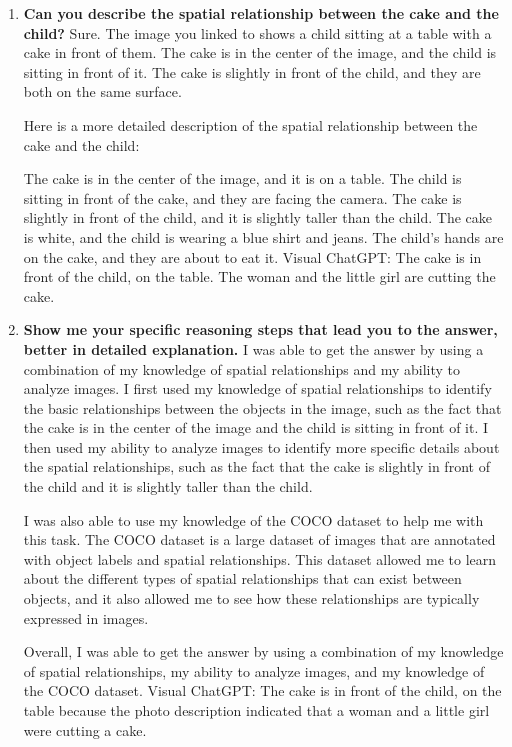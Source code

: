     \begin{enumerate}
        \item \textbf{Can you describe the spatial relationship between the cake and the child?}
        \subitem 
        Sure. The image you linked to shows a child sitting at a table with a cake in front of them. The cake is in the center of the image, and the child is sitting in front of it. The cake is slightly in front of the child, and they are both on the same surface.
        
        Here is a more detailed description of the spatial relationship between the cake and the child:
        
        The cake is in the center of the image, and it is on a table.
        The child is sitting in front of the cake, and they are facing the camera.
        The cake is slightly in front of the child, and it is slightly taller than the child.
        The cake is white, and the child is wearing a blue shirt and jeans.
        The child's hands are on the cake, and they are about to eat it.
        \subitem Visual ChatGPT: The cake is in front of the child, on the table. The woman and the little girl are cutting the cake.
        \item \textbf{Show me your specific reasoning steps that lead you to the answer, better in detailed explanation.}
        \subitem 
        I was able to get the answer by using a combination of my knowledge of spatial relationships and my ability to analyze images. I first used my knowledge of spatial relationships to identify the basic relationships between the objects in the image, such as the fact that the cake is in the center of the image and the child is sitting in front of it. I then used my ability to analyze images to identify more specific details about the spatial relationships, such as the fact that the cake is slightly in front of the child and it is slightly taller than the child.
        
        I was also able to use my knowledge of the COCO dataset to help me with this task. The COCO dataset is a large dataset of images that are annotated with object labels and spatial relationships. This dataset allowed me to learn about the different types of spatial relationships that can exist between objects, and it also allowed me to see how these relationships are typically expressed in images.
        
        Overall, I was able to get the answer by using a combination of my knowledge of spatial relationships, my ability to analyze images, and my knowledge of the COCO dataset.
        \subitem Visual ChatGPT: The cake is in front of the child, on the table because the photo description indicated that a woman and a little girl were cutting a cake.
    \end{enumerate}
